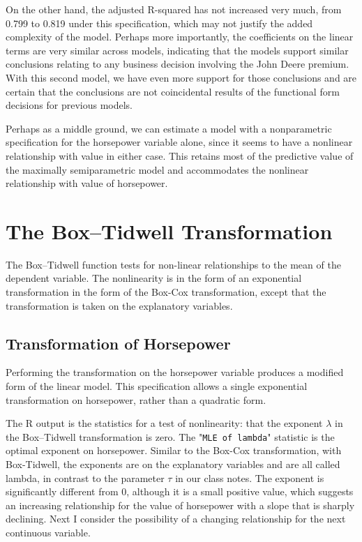 

On the other hand, 
the adjusted R-squared has not increased very much, 
from 0.799 to 0.819 under this specification, 
which may not justify the added complexity of the model.
Perhaps more importantly, the coefficients on the 
linear terms are very similar across models, 
indicating that the models support similar conclusions relating to any business decision involving
the John Deere premium. 
With this second model, we have even more support for those conclusions
and are certain that the conclusions are not 
coincidental results of the
functional form decisions for previous models.


Perhaps as a middle ground, we can estimate a model with a 
nonparametric specification for the horsepower variable alone, 
since it seems to have a nonlinear relationship with value in either case. 
This retains most of the predictive value of the maximally 
semiparametric model and accommodates the 
nonlinear relationship with value of horsepower. 




\pagebreak
\section{The Box--Tidwell Transformation}

The Box--Tidwell function tests for non-linear relationships
to the mean of the dependent variable.
The nonlinearity is in the form of an
exponential transformation in the form of the Box-Cox
transformation, except that the transformation is taken
on the explanatory variables.


\subsection{Transformation of Horsepower}


Performing the transformation on the horsepower variable
produces a modified form of the linear model.
This specification allows a single exponential
transformation on horsepower, rather than a quadratic form.



The \textsf{R} output is the statistics for a test of nonlinearity:
that the exponent $\lambda$ in the Box--Tidwell transformation is zero.
%
The "\texttt{MLE of lambda}" statistic is the optimal exponent on horsepower.
Similar to the Box-Cox transformation,
with Box-Tidwell, the exponents are on the explanatory variables
and are all called lambda, in contrast
to the parameter $\tau$ in our class notes.
The exponent is significantly different from 0,
although it is a small positive value,
which suggests an increasing relationship
for the value of horsepower
with a slope that is sharply declining.
Next I consider the possibility of a changing relationship 
for the next continuous variable. 


